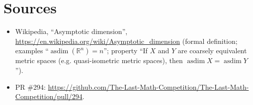 \documentclass[11pt]{article}
\theoremstyle{definition}
\DeclareMathOperator{\asdim}{asdim}
\begin{document}
\section*{Sources}
\begin{itemize}
\item Wikipedia, ``Asymptotic dimension'', \url{https://en.wikipedia.org/wiki/Asymptotic_dimension}
(formal definition; examples ``$\asdim(\mathbb R^n)=n$''; property ``If $X$ and $Y$ are coarsely
equivalent metric spaces (e.g. quasi-isometric metric spaces), then $\asdim X=\asdim Y$'').
\item PR \#294: \url{https://github.com/The-Last-Math-Competition/The-Last-Math-Competition/pull/294}.
\end{itemize}
\end{document}
